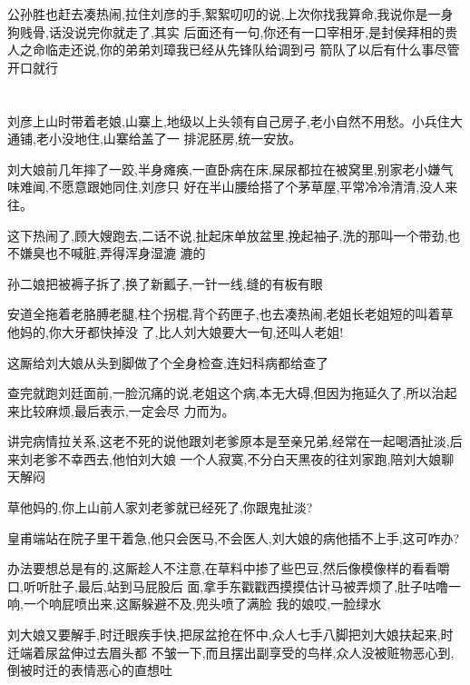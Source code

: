 ﻿\documentclass[12pt]{article}
\begin{document}
公孙胜也赶去凑热闹,拉住刘彦的手,絮絮叨叨的说,上次你找我算命,我说你是一身狗贱骨,话没说完你就走了,其实
后面还有一句,你还有一口宰相牙,是封侯拜相的贵人之命\dldots 临走还说,你的弟弟刘璋我已经从先锋队给调到弓
箭队了\dldots 以后有什么事尽管开口就行\dldots

\section{}

刘彦上山时带着老娘,山寨上,地级以上头领有自己房子,老小自然不用愁。小兵住大通铺,老小没地住,山寨给盖了一
排泥胚房,统一安放。

刘大娘前几年摔了一跤,半身瘫痪,一直卧病在床,屎尿都拉在被窝里,别家老小嫌气味难闻,不愿意跟她同住,刘彦只
好在半山腰给搭了个茅草屋,平常冷冷清清,没人来往。

这下热闹了,顾大嫂跑去,二话不说,扯起床单放盆里,挽起袖子,洗的那叫一个带劲,也不嫌臭也不喊脏,弄得浑身湿漉
漉的\dldots

孙二娘把被褥子拆了,换了新瓤子,一针一线,缝的有板有眼\dldots

安道全拖着老胳膊老腿,柱个拐棍,背个药匣子,也去凑热闹,老姐长老姐短的叫着\dldots 草他妈的,你大牙都快掉没
了,比人刘大娘要大一旬,还叫人老姐!

这厮给刘大娘从头到脚做了个全身检查,连妇科病都给查了\dldots

查完就跑刘廷面前,一脸沉痛的说,老姐这个病,本无大碍,但因为拖延久了,所以治起来比较麻烦,最后表示,一定会尽
力而为。

讲完病情拉关系,这老不死的说他跟刘老爹原本是至亲兄弟,经常在一起喝酒扯淡,后来刘老爹不幸西去,他怕刘大娘
一个人寂寞,不分白天黑夜的往刘家跑,陪刘大娘聊天解闷\dldots

草他妈的,你上山前人家刘老爹就已经死了,你跟鬼扯淡?

皇甫端站在院子里干着急,他只会医马,不会医人,刘大娘的病他插不上手,这可咋办?

办法要想总是有的,这厮趁人不注意,在草料中掺了些巴豆,然后像模像样的看看嚼口,听听肚子,最后,站到马屁股后
面,拿手东戳戳西摸摸\dldots 估计马被弄烦了,肚子咕噜一响,一个响屁喷出来,这厮躲避不及,兜头喷了满脸\dldots
我的娘哎,一脸绿水\dldots

刘大娘又要解手,时迁眼疾手快,把尿盆抢在怀中,众人七手八脚把刘大娘扶起来,时迁端着尿盆伸过去\dldots 眉头都
不皱一下,而且摆出副享受的鸟样,众人没被赃物恶心到,倒被时迁的表情恶心的直想吐

\section{}
\end{document}
